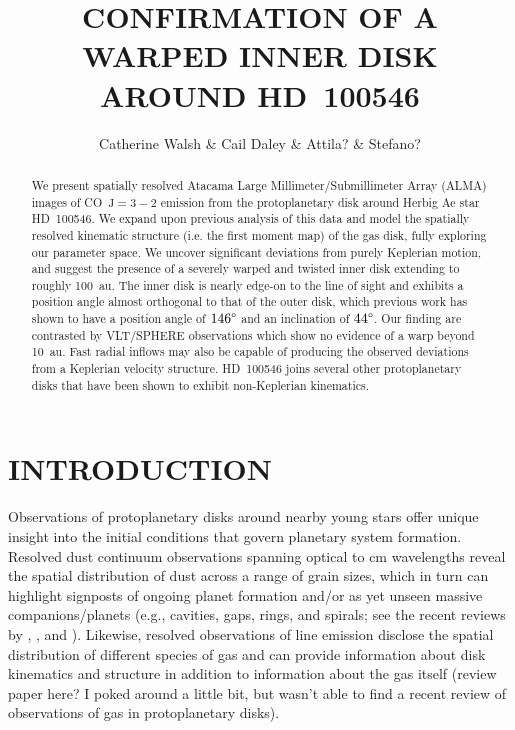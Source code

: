 \documentclass[onecolumn]{aastex6}
\makeatletter
\newcommand{\myemaila}{c.walsh1@leeds.ac.uk}
\newcommand{\myemailb}{cwalsh@strw.leidenuniv.nl}
\makeatother
\begin{document}
\title{CONFIRMATION OF A WARPED INNER DISK AROUND HD~100546}
\author{Catherine Walsh \& Cail Daley \& Attila? \& Stefano?}



\email{\myemaila; \myemailb}

\begin{abstract}   
We present spatially resolved Atacama Large Millimeter/Submillimeter Array
(ALMA) images of CO~$\mathrm{J}=3-2$ emission from the protoplanetary disk
around Herbig Ae star HD~100546. We expand upon previous analysis of this data
and model the spatially resolved kinematic structure (i.e. the first moment map)
of the gas disk, fully exploring our parameter space. We uncover significant
deviations from purely Keplerian motion, and suggest the presence of a severely
warped and twisted inner disk extending to roughly 100~au. The inner disk is
nearly edge-on to the line of sight and exhibits a position angle almost
orthogonal to that of the outer disk, which previous work has shown to have a
position angle of $146\degree$ and an inclination of $44\degree$. Our finding
are contrasted by VLT/SPHERE observations which show no evidence of a warp
beyond 10~au. Fast radial inflows may also be capable of producing the observed
deviations from a Keplerian velocity structure. HD~100546 joins several other protoplanetary disks that have been shown to exhibit non-Keplerian kinematics.
\end{abstract}

\section{INTRODUCTION}
\label{introduction}

Observations of protoplanetary disks around nearby young stars offer unique
insight into the initial conditions that govern planetary system formation.
Resolved dust continuum observations spanning optical to cm wavelengths reveal
the spatial distribution of dust across a range of grain sizes, which in turn
can highlight signposts of ongoing planet formation and/or as yet unseen massive
companions/planets (e.g., cavities, gaps, rings, and spirals; see the recent
reviews by \citealt{espaillat14}, \citealt{andrews15}, and \citealt{grady15}).
Likewise, resolved observations of line emission disclose the spatial
distribution of different species of gas and can provide information about
disk kinematics and structure in addition to information about the gas itself (review paper here? I poked around a little bit, but wasn't able to find a recent review of observations of gas in protoplanetary disks).
\end{document}

